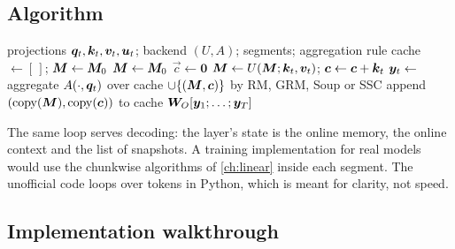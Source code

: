 \subsection{Algorithm}

\begin{algorithm}[t]
\caption{Memory Caching layer, per-token form (as in the unofficial implementation)}
\label{alg:c13-mc}
\begin{algorithmic}[1]
\Require projections $\bm{q}_t,\bm{k}_t,\bm{v}_t,\bm{u}_t$; backend $(U,A)$; segments; aggregation rule
\State cache $\gets[\,]$; $\bm{M}\gets\bm{M}_0$
    \State $\bm{M}\gets\bm{M}_0$
  \EndIf
  \State $\vec{c}\gets\bm{0}$
    \State $\bm{M}\gets U(\bm{M};\bm{k}_t,\bm{v}_t)$; $\bm{c}\gets\bm{c}+\bm{k}_t$
    \State $\bm{y}_t\gets$ aggregate $A(\cdot,\bm{q}_t)$ over cache $\cup\{(\bm{M},\bm{c})\}$ by RM, GRM, Soup or SSC
  \EndFor
  \State append $(\operatorname{copy}(\bm{M}),\operatorname{copy}(\bm{c}))$ to cache 
\EndFor
\State \Return $\bm{W}_O[\bm{y}_1;\dots;\bm{y}_T]$
\end{algorithmic}
\end{algorithm}

The same loop serves decoding: the layer's state is the online memory, the online context and the list
of snapshots. A training implementation for real models would use the chunkwise algorithms of
\cref{ch:linear} inside each segment. The unofficial code loops over tokens in Python, which is meant for
clarity, not speed.

\subsection{Implementation walkthrough}\label{sec:c13-mc-impl}

